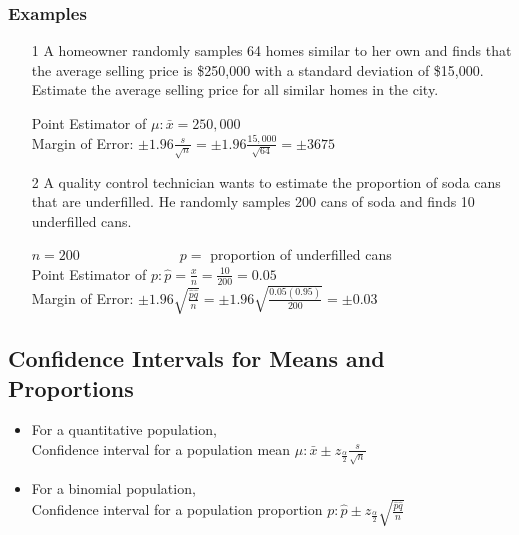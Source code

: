 \documentclass[12pt, letterpaper]{article}
\begin{document}
            \subsubsection*{Examples}
                \begin{itemize}
                    \item[1] A homeowner randomly samples 64 homes similar to her own and finds that the average selling price is \$250,000 with a standard deviation of \$15,000. Estimate the average selling price for all similar homes in the city.
                    \begin{mdframed}[leftmargin=0.5cm,rightmargin=0.5cm]
                        Point Estimator of $\mu : \bar{x} = 250,000$
                        \\ Margin of Error: $\pm 1.96\frac{s}{\sqrt{n}} = \pm 1.96\frac{15,000}{\sqrt{64}} = \pm 3675$
                    \end{mdframed} 
                    \item[2] A quality control technician wants to estimate the proportion of soda cans that are underfilled. He randomly samples 200 cans of soda and finds 10 underfilled cans.
                    \begin{mdframed}[leftmargin = 0.5cm, rightmargin = 0.5cm]
                        $n = 200 \hspace{3cm} p =$ proportion of underfilled cans \\ 
                        Point Estimator of $p : \hat{p} = \frac{x}{n} = \frac{10}{200} = 0.05$ \\
                        Margin of Error: $\pm 1.96\sqrt{\frac{\hat{p}\hat{q}}{n}} = \pm 1.96\sqrt{\frac{0.05(0.95)}{200}} = \pm 0.03$
                    \end{mdframed}
                \end{itemize}
        \subsection{Confidence Intervals for Means and Proportions}
            \begin{itemize}
                \item For a quantitative population, \\ Confidence interval for a population mean $\mu : \bar{x} \pm z_{\frac{\alpha}{2}}\frac{s}{\sqrt{n}}$
                \item For a binomial population, \\ Confidence interval for a population proportion $p  : \hat{p} \pm z_{\frac{\alpha}{2}}\sqrt{\frac{\hat{p}\hat{q}}{n}}$
            \end{itemize}
\end{document}
